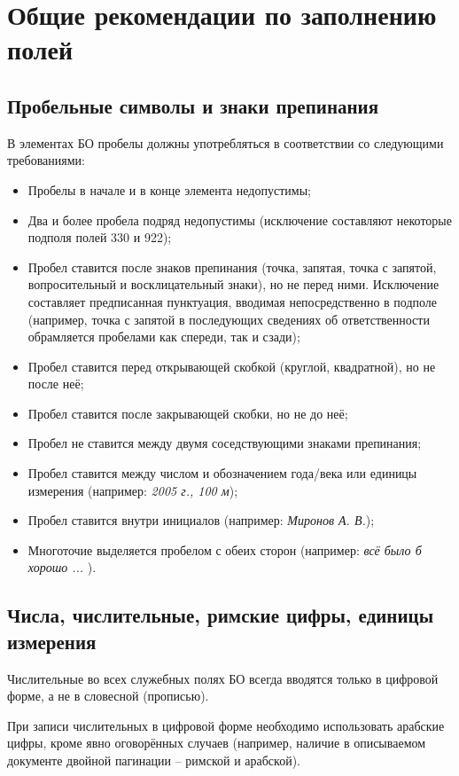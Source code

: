 \chapter{Общие рекомендации по заполнению полей}

\section{Пробельные символы и знаки препинания}

В элементах БО пробелы должны употребляться в соответствии со следующими требованиями:

\begin{itemize}
	\item Пробелы в начале и в конце элемента недопустимы;
	\item Два и более пробела подряд недопустимы (исключение составляют некоторые подполя полей 330 и 922);
	\item Пробел ставится после знаков препинания (точка, запятая, точка с запятой, вопросительный и восклицательный знаки), но не перед ними. Исключение составляет предписанная пунктуация, вводимая непосредственно в подполе (например, точка с запятой в последующих сведениях об ответственности обрамляется пробелами как спереди, так и сзади);
	\item Пробел ставится перед открывающей скобкой (круглой, квадратной), но не после неё;
	\item Пробел ставится после закрывающей скобки, но не до неё;
	\item Пробел не ставится между двумя соседствующими знаками препинания;
	\item Пробел ставится между числом и обозначением года/века или единицы измерения (например: \textit{2005 г., 100 м});
	\item Пробел ставится внутри инициалов (например: \textit{Миронов А. В.});
	\item Многоточие выделяется пробелом с обеих сторон (например: \textit{всё было б хорошо ... }).
\end{itemize}

\section{Числа, числительные, римские цифры, единицы измерения}

Числительные во всех служебных полях БО всегда вводятся только в цифровой форме, а не в словесной (прописью).

При записи числительных в цифровой форме необходимо использовать арабские цифры, кроме явно оговорённых случаев (например, наличие в описываемом документе двойной пагинации -- римской и арабской).


